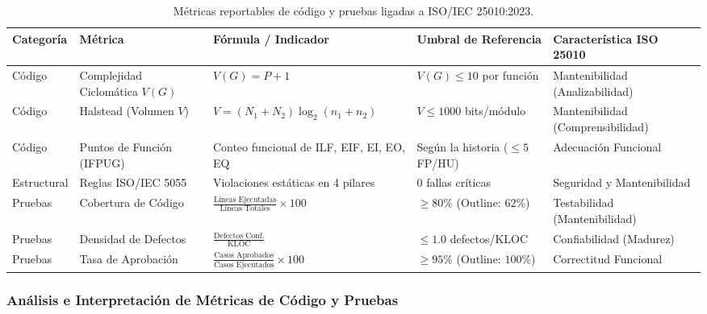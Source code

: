 \documentclass[12pt, letterpaper]{article}
\begin{document}
\begin{table}[H]
\centering
\small
\caption{Métricas reportables de código y pruebas ligadas a ISO/IEC 25010:2023.}
\label{tab:metricas_calidad}
\begin{tabular}{|p{2.5cm}|p{3.2cm}|p{3.5cm}|p{2.8cm}|p{3.0cm}|}
\hline
\textbf{Categoría} & \textbf{Métrica} & \textbf{Fórmula / Indicador} & \textbf{Umbral de Referencia} & \textbf{Característica ISO 25010} \\ \hline
Código & Complejidad Ciclomática $V(G)$ & $V(G) = P + 1$ \cite{mccabe1976} & $V(G) \le 10$ por función & Mantenibilidad (Analizabilidad) \\ \hline
Código & Halstead (Volumen $V$) & $V = (N_1 + N_2) \log_2 (n_1 + n_2)$ & $V \le 1000$ bits/módulo & Mantenibilidad (Comprensibilidad) \\ \hline
Código & Puntos de Función (IFPUG) & Conteo funcional de ILF, EIF, EI, EO, EQ & Según la historia ($\le 5$ FP/HU) & Adecuación Funcional \\ \hline
Estructural & Reglas ISO/IEC 5055 & Violaciones estáticas en 4 pilares & 0 fallas críticas & Seguridad y Mantenibilidad \\ \hline
Pruebas & Cobertura de Código & $\frac{\text{Líneas Ejecutadas}}{\text{Líneas Totales}} \times 100$ & $\ge 80\%$ (Outline: $62\%$) & Testabilidad (Mantenibilidad) \\ \hline
Pruebas & Densidad de Defectos & $\frac{\text{Defectos Conf.}}{\text{KLOC}}$ & $\le 1.0$ defectos/KLOC & Confiabilidad (Madurez) \\ \hline
Pruebas & Tasa de Aprobación & $\frac{\text{Casos Aprobados}}{\text{Casos Ejecutados}} \times 100$ & $\ge 95\%$ (Outline: $100\%$) & Correctitud Funcional \\ \hline
\end{tabular}
\end{table}

\subsubsection{Análisis e Interpretación de Métricas de Código y Pruebas}
\end{document}
